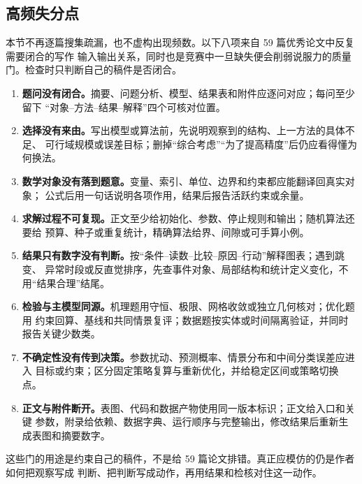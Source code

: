 \subsection{高频失分点}

本节不再逐篇搜集疏漏，也不虚构出现频数。以下八项来自 59 篇优秀论文中反复需要闭合的写作
输入输出关系，同时也是竞赛中一旦缺失便会削弱说服力的质量门。检查时只判断自己的稿件是否闭合。

\begin{enumerate}
  \item \textbf{题问没有闭合。}摘要、问题分析、模型、结果表和附件应逐问对应；每问至少留下
  “对象--方法--结果--解释”四个可核对位置。
  \item \textbf{选择没有来由。}写出模型或算法前，先说明观察到的结构、上一方法的具体不足、
  可行域规模或误差目标；删掉“综合考虑”“为了提高精度”后仍应看得懂为何换法。
  \item \textbf{数学对象没有落到题意。}变量、索引、单位、边界和约束都应能翻译回真实对象；
  公式后用一句话说明各项作用，结果后报告活跃约束或余量。
  \item \textbf{求解过程不可复现。}正文至少给初始化、参数、停止规则和输出；随机算法还要给
  预算、种子或重复统计，精确算法给界、间隙或可手算小例。
  \item \textbf{结果只有数字没有判断。}按“条件--读数--比较--原因--行动”解释图表；遇到跳变、
  异常时段或反直觉排序，先查事件对象、局部结构和统计定义变化，不用“结果合理”结尾。
  \item \textbf{检验与主模型同源。}机理题用守恒、极限、网格收敛或独立几何核对；优化题用
  约束回算、基线和共同情景复评；数据题按实体或时间隔离验证，并同时报告关键少数类。
  \item \textbf{不确定性没有传到决策。}参数扰动、预测概率、情景分布和中间分类误差应进入
  目标或约束；区分固定策略复算与重新优化，并给稳定区间或策略切换点。
  \item \textbf{正文与附件断开。}表图、代码和数据产物使用同一版本标识；正文给入口和关键
  参数，附录给依赖、数据字典、运行顺序与完整输出，修改结果后重新生成表图和摘要数字。
\end{enumerate}

这些门的用途是约束自己的稿件，不是给 59 篇论文排错。真正应模仿的仍是作者如何把观察写成
判断、把判断写成动作，再用结果和检核对住这一动作。
